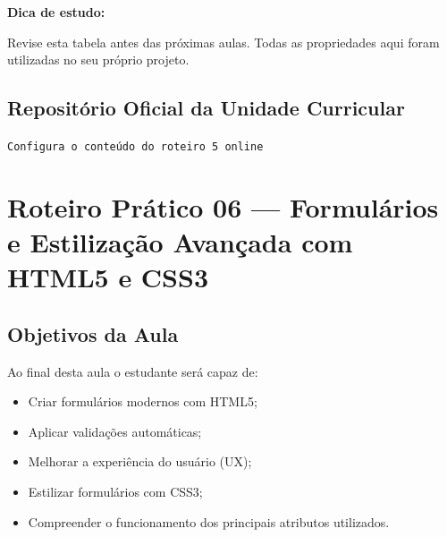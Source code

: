 \documentclass[12pt,a4paper]{article}
\begin{document}
\begin{boxDica}
\textbf{Dica de estudo:}

Revise esta tabela antes das próximas aulas.  
Todas as propriedades aqui foram utilizadas no seu próprio projeto.
\end{boxDica}




\subsection{Repositório Oficial da Unidade Curricular}

\begin{tcolorbox}[
colback=azulTitulo!5,
colframe=azulTitulo,
title=\textbf{Repositório Oficial da Disciplina}
]

\begin{center}
\end{center}

\begin{center}
\texttt{Configura o conteúdo do roteiro 5 online}
\end{center}

\end{tcolorbox}


\newpage




\section{Roteiro Prático 06 — Formulários e Estilização Avançada com HTML5 e CSS3}


\subsection{Objetivos da Aula}

\begin{boxObjetivos}
Ao final desta aula o estudante será capaz de:

\begin{itemize}
\item Criar formulários modernos com HTML5;
\item Aplicar validações automáticas;
\item Melhorar a experiência do usuário (UX);
\item Estilizar formulários com CSS3;
\item Compreender o funcionamento dos principais atributos utilizados.
\end{itemize}
\end{boxObjetivos}
\end{document}
